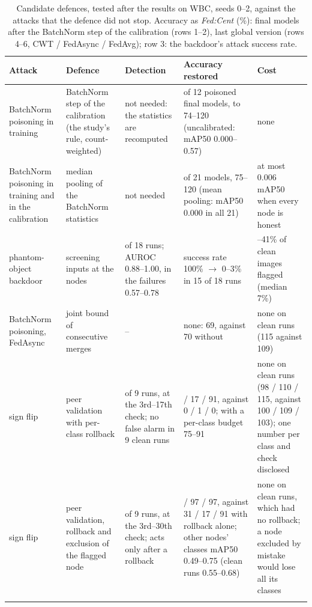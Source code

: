 \documentclass[pdflatex,sn-mathphys-num]{sn-jnl}
\newcommand{\fedcent}{\textit{Fed:Cent}}
\begin{document}
\begin{table}[t]
\caption{Candidate defences, tested after the results on WBC, seeds 0--2, against the attacks that the defence did not stop. Accuracy as \fedcent{} (\%): final models after the BatchNorm step of the calibration (rows 1--2), last global version (rows 4--6, CWT / FedAsync / FedAvg); row 3: the backdoor's attack success rate.}\label{tab:candidates}
\footnotesize
\setlength{\tabcolsep}{3pt}
\begin{tabular*}{\textwidth}{@{\extracolsep\fill}>{\raggedright\arraybackslash}p{}>{\raggedright\arraybackslash}p{}>{\raggedright\arraybackslash}p{}>{\raggedright\arraybackslash}p{}>{\raggedright\arraybackslash}p{}@{}}
\toprule
Attack & Defence & Detection & Accuracy restored & Cost \\
\midrule
BatchNorm poisoning in training & BatchNorm step of the calibration (the study's rule, count-weighted) & not needed: the statistics are recomputed & 12 of 12 poisoned final models, to 74--120 (uncalibrated: mAP50 0.000--0.57) & none \\
\addlinespace
BatchNorm poisoning in training and in the calibration & median pooling of the BatchNorm statistics & not needed & 21 of 21 models, 75--120 (mean pooling: mAP50 0.000 in all 21) & at most 0.006 mAP50 when every node is honest \\
\addlinespace
phantom-object backdoor & screening inputs at the nodes & 15 of 18 runs; AUROC 0.88--1.00, in the failures 0.57--0.78 & success rate 100\% $\rightarrow$ 0--3\% in 15 of 18 runs & 0--41\% of clean images flagged (median 7\%) \\
\addlinespace
BatchNorm poisoning, FedAsync & joint bound of consecutive merges & -- & none: 69, against 70 without & none on clean runs (115 against 109) \\
\addlinespace
sign flip & peer validation with per-class rollback & 9 of 9 runs, at the 3rd--17th check; no false alarm in 9 clean runs & 31 / 17 / 91, against 0 / 1 / 0; with a per-class budget 75--91 & none on clean runs (98 / 110 / 115, against 100 / 109 / 103); one number per class and check disclosed \\
\addlinespace
sign flip & peer validation, rollback and exclusion of the flagged node & 9 of 9 runs, at the 3rd--30th check; acts only after a rollback & 77 / 97 / 97, against 31 / 17 / 91 with rollback alone; other nodes' classes mAP50 0.49--0.75 (clean runs 0.55--0.68) & none on clean runs, which had no rollback; a node excluded by mistake would lose all its classes \\
\botrule
\end{tabular*}
\end{table}
\end{document}
